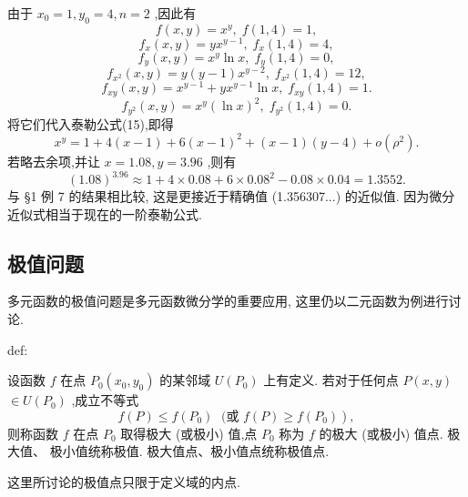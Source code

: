 \begin{solution}

\end{solution}
由于 \({x}_{0} = 1,{y}_{0} = 4,n = 2\) ,因此有
\[
f\left( {x,y}\right)  = {x}^{y},\;f\left( {1,4}\right)  = 1,
\]
\[
{f}_{x}\left( {x,y}\right)  = y{x}^{y - 1},\;{f}_{x}\left( {1,4}\right)  = 4,
\]
\[
{f}_{y}\left( {x,y}\right)  = {x}^{y}\ln x,\;{f}_{y}\left( {1,4}\right)  = 0,
\]
\[
{f}_{{x}^{2}}\left( {x,y}\right)  = y\left( {y - 1}\right) {x}^{y - 2},\;{f}_{{x}^{2}}\left( {1,4}\right)  = {12},
\]
\[
{f}_{xy}\left( {x,y}\right)  = {x}^{y - 1} + y{x}^{y - 1}\ln x,\;{f}_{xy}\left( {1,4}\right)  = 1.
\]
\[
{f}_{{y}^{2}}\left( {x,y}\right)  = {x}^{y}{\left( \ln x\right) }^{2},\;{f}_{{y}^{2}}\left( {1,4}\right)  = 0.
\]
将它们代入泰勒公式(15),即得
\[
{x}^{y} = 1 + 4\left( {x - 1}\right)  + 6{\left( x - 1\right) }^{2} + \left( {x - 1}\right) \left( {y - 4}\right)  + o\left( {\rho }^{2}\right) .
\]
若略去余项,并让 \(x = {1.08},y = {3.96}\) ,则有
\[
{\left( {1.08}\right) }^{3.96} \approx  1 + 4 \times  {0.08} + 6 \times  {0.08}^{2} - {0.08} \times  {0.04} = {1.3552}.
\]
与 §1 例 7 的结果相比较, 这是更接近于精确值 (1.356307...) 的近似值. 因为微分近似式相当于现在的一阶泰勒公式.

\subsection{极值问题}

多元函数的极值问题是多元函数微分学的重要应用, 这里仍以二元函数为例进行讨论.

\begin{definition}{}{def:}

\end{definition}
设函数 \(f\) 在点 \({P}_{0}\left( {{x}_{0},{y}_{0}}\right)\) 的某邻域 \(U\left( {P}_{0}\right)\) 上有定义. 若对于任何点 \(P\left( {x,y}\right)\)  \(\in  U\left( {P}_{0}\right)\) ,成立不等式
\[
\left. {f\left( P\right)  \leq  f\left( {P}_{0}\right) \;\text{ (或 }f\left( P\right)  \geq  f\left( {P}_{0}\right) }\right) ,
\]
则称函数 \(f\) 在点 \({P}_{0}\) 取得极大 (或极小) 值,点 \({P}_{0}\) 称为 \(f\) 的极大 (或极小) 值点. 极大值、 极小值统称极值. 极大值点、极小值点统称极值点.

\begin{remark}

\end{remark}
这里所讨论的极值点只限于定义域的内点.

